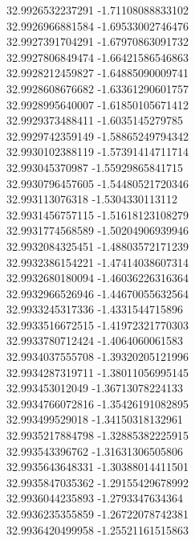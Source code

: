 {32.9926532237291	-1.71108088833102\\
32.9926966881584	-1.69533002746476\\
32.9927391704291	-1.67970863091732\\
32.9927806849474	-1.66421586546863\\
32.9928212459827	-1.64885090009741\\
32.9928608676682	-1.63361290601757\\
32.9928995640007	-1.61850105671412\\
32.9929373488411	-1.6035145279785\\
32.9929742359149	-1.58865249794342\\
32.9930102388119	-1.57391414711714\\
32.993045370987	-1.55929865841715\\
32.9930796457605	-1.54480521720346\\
32.993113076318	-1.5304330113112\\
32.9931456757115	-1.51618123108279\\
32.9931774568589	-1.50204906939946\\
32.9932084325451	-1.48803572171239\\
32.9932386154221	-1.47414038607314\\
32.9932680180094	-1.46036226316364\\
32.9932966526946	-1.44670055632564\\
32.9933245317336	-1.4331544715896\\
32.9933516672515	-1.41972321770303\\
32.9933780712424	-1.4064060061583\\
32.9934037555708	-1.39320205121996\\
32.9934287319711	-1.38011056995145\\
32.993453012049	-1.36713078224133\\
32.9934766072816	-1.35426191082895\\
32.993499529018	-1.34150318132961\\
32.9935217884798	-1.32885382225915\\
32.993543396762	-1.31631306505806\\
32.9935643648331	-1.30388014411501\\
32.9935847035362	-1.29155429678992\\
32.9936044235893	-1.2793347634364\\
32.9936235355859	-1.26722078742381\\
32.9936420499958	-1.25521161515863\\
}
